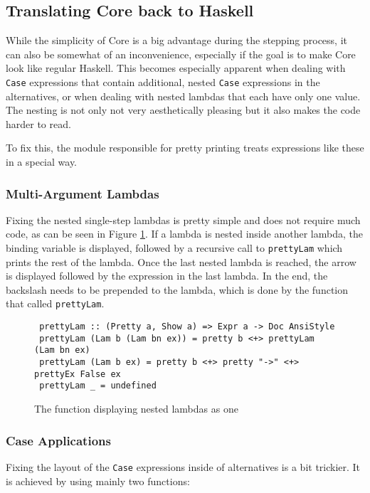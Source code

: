 \subsection{Translating Core back to Haskell}
While the simplicity of Core is a big advantage during the stepping process,
it can also be somewhat of an inconvenience,
especially if the goal is to make Core look like regular Haskell.
This becomes especially apparent when dealing with \texttt{Case} expressions that contain additional, nested \texttt{Case} expressions in the alternatives,
or when dealing with nested lambdas that each have only one value.
The nesting is not only not very aesthetically pleasing but it also makes the code harder to read.

To fix this,
the module responsible for pretty printing treats expressions like these in a special way.

\subsubsection{Multi-Argument Lambdas}
Fixing the nested single-step lambdas is pretty simple and does not require much code,
as can be seen in Figure \ref*{fig:prettyLambda}.
If a lambda is nested inside another lambda,
the binding variable is displayed,
followed by a recursive call to \texttt{prettyLam} which prints the rest of the lambda.
Once the last nested lambda is reached,
the arrow is displayed followed by the expression in the last lambda.
In the end, the backslash needs to be prepended to the lambda,
which is done by the function that called \texttt{prettyLam}.

\begin{figure}[!ht]
\begin{verbatim}
 prettyLam :: (Pretty a, Show a) => Expr a -> Doc AnsiStyle
 prettyLam (Lam b (Lam bn ex)) = pretty b <+> prettyLam (Lam bn ex)
 prettyLam (Lam b ex) = pretty b <+> pretty "->" <+> prettyEx False ex
 prettyLam _ = undefined
\end{verbatim}
    \caption{The function displaying nested lambdas as one}
    \label{fig:prettyLambda}
\end{figure}

\subsubsection{Case Applications}
Fixing the layout of the \texttt{Case} expressions inside of alternatives is a bit trickier.
It is achieved by using mainly two functions:


